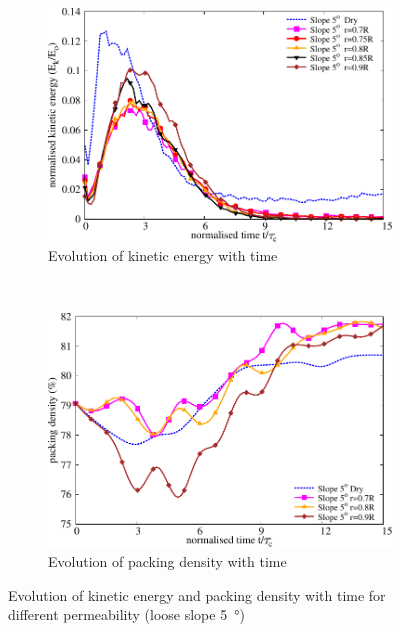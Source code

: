 \begin{figure}
\centering
\begin{subfigure}[b]{0.95\textwidth}
\includegraphics[width=0.95\columnwidth]{KE_loose_5_slope}
\caption{Evolution of kinetic energy with time}
\label{fig:KE5}
\end{subfigure} \\
\begin{subfigure}[b]{0.95\textwidth}
\centering
\includegraphics[width=0.95\columnwidth]{Voronoi_5}
\caption{Evolution of packing density with time}
\label{fig:voro5}
\end{subfigure}
\caption{Evolution of kinetic energy and packing density with time for 
different permeability (loose slope \SI{5}{\degree})}
\label{fig:voro_ke_5}
\end{figure}

